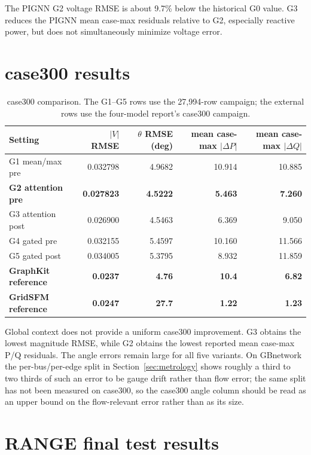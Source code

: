 \documentclass[10pt]{article}
\begin{document}
The PIGNN G2 voltage RMSE is about 9.7\% below the historical G0 value.  G3
reduces the PIGNN mean case-max residuals relative to G2, especially reactive
power, but does not simultaneously minimize voltage error.

\section{case300 results}

\begin{table}[H]
\centering\footnotesize
\begin{tabular}{lrrrr}
\toprule
Setting & $|V|$ RMSE & $\theta$ RMSE (deg) & mean case-max $|\Delta P|$ & mean case-max $|\Delta Q|$\\
\midrule
G1 mean/max pre & 0.032798 & 4.9682 & 10.914 & 10.885\\
\textbf{G2 attention pre} & \textbf{0.027823} & \textbf{4.5222} & \textbf{5.463} & \textbf{7.260}\\
G3 attention post & 0.026900 & 4.5463 & 6.369 & 9.050\\
G4 gated pre & 0.032155 & 5.4597 & 10.160 & 11.566\\
G5 gated post & 0.034005 & 5.3795 & 8.932 & 11.859\\
\textbf{GraphKit reference} & \textbf{0.0237} & \textbf{4.76} & \textbf{10.4} & \textbf{6.82}\\
\textbf{GridSFM reference} & \textbf{0.0247} & \textbf{27.7} & \textbf{1.22} & \textbf{1.23}\\
\bottomrule
\end{tabular}
\caption{case300 comparison.  The G1--G5 rows use the 27,994-row campaign;
the external rows use the four-model report's case300 campaign.}
\end{table}

Global context does not provide a uniform case300 improvement.  G3 obtains
the lowest magnitude RMSE, while G2 obtains the lowest reported mean case-max
P/Q residuals.  The angle errors remain large for all five variants.  On GBnetwork the
per-bus/per-edge split in Section~\ref{sec:metrology} shows roughly a third to
two thirds of such an error to be gauge drift rather than flow error; the same
split has not been measured on case300, so the case300 angle column should be
read as an upper bound on the flow-relevant error rather than as its size.

\section{RANGE final test results}
\end{document}
